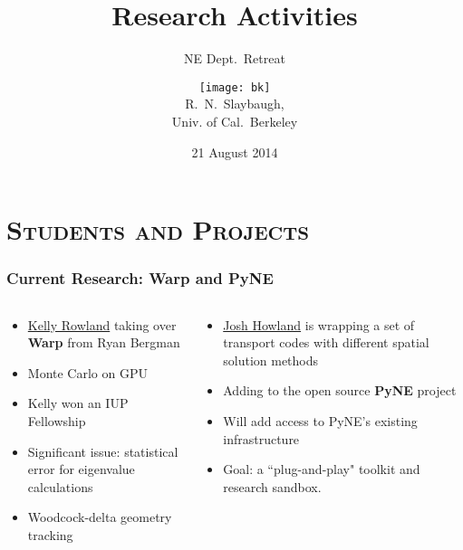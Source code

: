 \documentclass[xcolor=x11names,compress]{beamer}
\renewcommand{\(}{\begin{columns}}
\renewcommand{\)}{\end{columns}}
\newcommand{\<}[1]{\begin{column}{#1}}
\renewcommand{\>}{\end{column}}
\begin{document}
\begin{frame}
\title{Research Activities}
\subtitle{NE Dept.\ Retreat}
\author{
        \texttt{[image: bk]}\\R.\ N.\ Slaybaugh, \\ Univ. of Cal.\ Berkeley}

\date{21 August 2014}
\titlepage
\end{frame}


\section{\scshape Students and Projects}
\begin{frame}[fragile]
  \frametitle{Current Research: Warp and PyNE}

	\begin{columns}
  	\begin{column}{0.5\textwidth}
	\begin{itemize}
	  \item \underline{Kelly Rowland} taking over \textbf{Warp} from Ryan Bergman
	  \item Monte Carlo on GPU
	  \item Kelly won an IUP Fellowship
	  \item Significant issue: statistical error for eigenvalue calculations
	  \item Woodcock-delta geometry tracking
	\end{itemize}
  	\end{column}
 	\begin{column}{0.5\textwidth}
 	 \begin{itemize}
       \item \underline{Josh Howland} is wrapping a set of transport codes with different spatial solution methods
       \item Adding to the open source \textbf{PyNE} project
       \item Will add access to PyNE's existing infrastructure
       \item Goal: a ``plug-and-play" toolkit and research sandbox.
 	 \end{itemize}
  	\end{column}
	\end{columns}

\end{frame}
\end{document}
